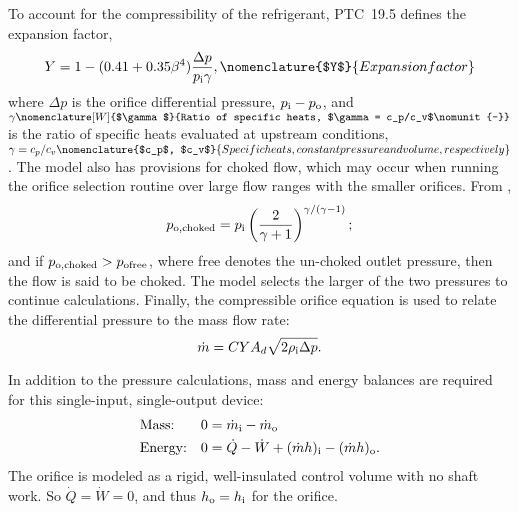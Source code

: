 To account for the compressibility of the refrigerant, PTC~19.5 defines
the expansion factor,
\begin{equation}
Y = 1 - (0.41 + 0.35 \beta^4) \frac{\Delta p}{p_{\inl}\gamma},
\nomenclature{$Y$}{Expansion factor\nomunit{-}}
\end{equation}
where $\Delta p$ is the orifice differential pressure, $p_{\text{i}}-p_{\text{o}}$, and
$\gamma\nomenclature[W]{$\gamma$}{Ratio of specific heats, $\gamma = c_p/c_v$\nomunit{-}}$ 
is the ratio of specific heats evaluated at upstream conditions, 
$\gamma = c_p/c_v\nomenclature{$c_p$, $c_v$}{Specific heats, constant pressure and volume, respectively\nomunit{\btu\per\poundmass\rankine}}$.
%
%
%
%
%
The model also has provisions for choked flow, which may occur when 
running the orifice selection routine over large flow ranges with the smaller orifices.
From \textcite{munson2009}, 
\begin{equation}
p_{\text{o},\text{choked}} = p_{\text{i}} \left(\frac{2}{\gamma+1}\right)^{\gamma/(\gamma-1)};
\label{eqn:choked}
\end{equation}
and if $p_{\text{o},\text{choked}} > p_{\text{o}\text{free}}$, where free denotes 
the un-choked outlet pressure, then the flow is said to be choked.
The model selects the larger of the two pressures to continue calculations.
Finally, the compressible orifice equation is used to relate the differential pressure to the mass flow rate:
\begin{equation}
\dot{m} = C Y A_d \sqrt{2\rho_{\text{i}} \Delta p}.
\end{equation}

In addition to the pressure calculations, mass and energy balances are required
for this single-input, single-output device:
\begin{align}
  &\text{Mass:}   & 0 &= {\dot{m}_{\inl}} - {\dot{m}_{\out}} \\ %
  &\text{Energy:} & 0 &= \dot{Q} - \dot{W} + {(\dot{m}h)_{\inl}} - 
		{(\dot{m}h)_{\out}} \label{eqn:OrifEnergy}.
\end{align}
The orifice is modeled as a rigid, well-insulated control volume with no shaft work. 
So $\dot{Q}=\dot{W}=0$, and thus $h_{\text{o}} = h_{\text{i}}$ for the orifice.

